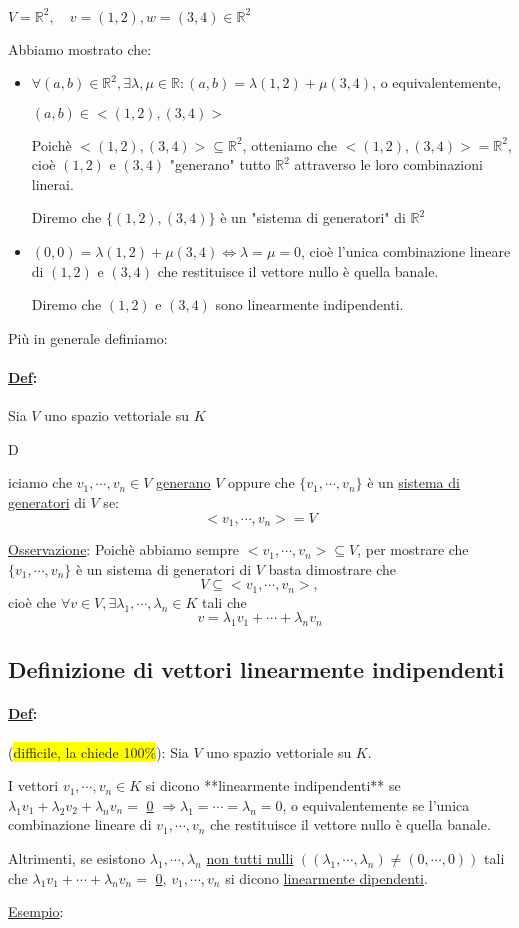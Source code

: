 \documentclass{article}
\newcommand{\hl}[1]{\colorbox{yellow}{#1}}
\newcommand{\ul}[1]{\underline{#1}}
\newcommand{\R}{\mathbb{R}}
\newcommand{\Def}[2]{\paragraph{\ul{Def}:}#1\\\hspace*{3em}\begin{minipage}{.8\textwidth}#2\end{minipage}}
\begin{document}
$V=\R^2,\quad v=(1,2),w=(3,4)\in\R^2$

	Abbiamo mostrato che:
	\begin{itemize}
		\item $\forall(a,b)\in\R^2,\exists\lambda,\mu\in\R:(a,b)=\lambda(1,2)+\mu(3,4)$, o equivalentemente,

		      $(a,b)\in<(1,2),(3,4)>$

		      Poichè $<(1,2),(3,4)>\subseteq\R^2$, otteniamo che $<(1,2),(3,4)>=\R^2$, cioè $(1,2)$ e $(3,4)$ "generano" tutto $\R^2$ attraverso le loro combinazioni linerai.

		      Diremo che $\{(1,2),(3,4)\}$ è un "sistema di generatori" di $\R^2$
		\item $(0,0)=\lambda(1,2)+\mu(3,4)\Leftrightarrow\lambda=\mu=0$, cioè l'unica combinazione lineare di $(1,2)$ e $(3,4)$ che restituisce il vettore nullo è quella banale.

		      Diremo che $(1,2)$ e $(3,4)$ sono linearmente indipendenti.
	\end{itemize}

	Più in generale definiamo:

	\Def{Sia $V$ uno spazio vettoriale su $K$}

	Diciamo che $v_1,\cdots,v_n\in V$ \ul{generano} $V$ oppure che $\{v_1,\cdots,v_n\}$ è un \ul{sistema di generatori} di $V$ se:
	$$<v_1,\cdots,v_n>=V$$

	\ul{Osservazione}: Poichè abbiamo sempre $<v_1,\cdots,v_n>\subseteq V$, per mostrare che $\{v_1,\cdots,v_n\}$ è un sistema di generatori di $V$ basta dimostrare che
	$$V\subseteq<v_1,\cdots,v_n>,$$
	cioè che $\forall v\in V,\exists\lambda_1,\cdots,\lambda_n\in K$ tali che
	$$v=\lambda_1v_1+\cdots+\lambda_nv_n$$

	\subsection{Definizione di vettori linearmente indipendenti}
	\Def{(\hl{difficile, la chiede 100\%}): Sia $V$ uno spazio vettoriale su $K$.}{
		I vettori $v_1,\cdots,v_n\in K$ si dicono **linearmente indipendenti** se
		$\lambda_1v_1+\lambda_2v_2+\lambda_nv_n=$ \ul{0} $\Rightarrow\lambda_1=\cdots=\lambda_n=0$, o equivalentemente se l'unica combinazione lineare di $v_1,\cdots,v_n$ che restituisce il vettore nullo è quella banale.

		Altrimenti, se esistono $\lambda_1,\cdots,\lambda_n$ \ul{non tutti nulli} $((\lambda_1,\cdots,\lambda_n)\not=(0,\cdots,0))$ tali che $\lambda_1v_1+\cdots+\lambda_nv_n=$ \ul{0}, $v_1,\cdots,v_n$ si dicono \ul{linearmente dipendenti}.
	}
	\ul{Esempio}:
\end{document}
